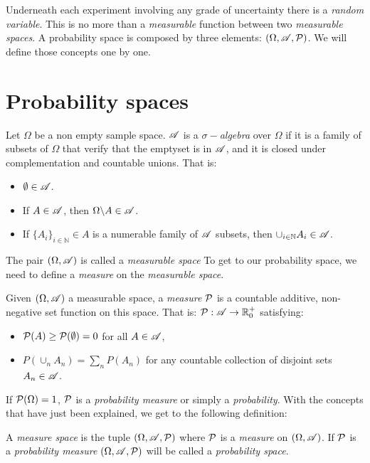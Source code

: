 

Underneath each experiment involving any grade of uncertainty there is a \emph{random variable}. This is no more than a \emph{measurable} function between two \emph{measurable spaces}.
A probability space is composed by three elements: $(\Omega, \mathscr{A}, \mathcal{P})$. We will define those concepts one by one.

\section{Probability spaces}

\begin{ndef}Let $\Omega$ be a non empty sample space. $\mathscr{A}$ is a \emph{$\sigma-$algebra} over $\Omega$ if it is a family of subsets of $\Omega$ that verify that the emptyset is in $\mathscr{A}$, and it is closed under complementation and countable unions. That is:
\begin{itemize}
  \item $\emptyset \in \mathscr{A}$.
  \item If $A \in \mathscr{A}$, then $\Omega \backslash A \in \mathscr{A}$.
  \item If $\{A_i\}_{i \in \mathbb N} \in A$ is a numerable family of $\mathscr{A}$ subsets, then $\cup_{i \in \mathbb N} A_i \in \mathscr{A}$.
\end{itemize}
\end{ndef}


The pair $(\Omega,\mathscr{A})$ is called a \emph{measurable space} To get to our probability space, we need to define a \emph{measure} on the \emph{measurable space}.

\begin{ndef}
Given $(\Omega,\mathscr{A})$ a measurable space, a \emph{measure} $\mathcal{P}$ is a countable additive, non-negative set function on this space. That is: $\mathcal{P}: \mathscr{A} \to \mathbb R_0^+$ satisfying:
\begin{itemize}
  \item $\mathcal{P}(A) \geq \mathcal{P}(\emptyset) = 0$ for all $A \in \mathscr{A}$,
  \item $P(\cup_n A_n) = \sum_n P(A_n)$ for any countable collection of disjoint sets $A_n \in \mathscr{A}$.
\end{itemize}
\end{ndef}

If $\mathcal{P}(\Omega) = 1$, $\mathcal{P}$ is a \emph{probability measure} or simply a \emph{probability}. With the concepts that have just been explained, we get to the following definition:

\begin{ndef}
A \emph{measure space} is the tuple $(\Omega, \mathscr{A},\mathcal{P})$ where $\mathcal{P}$ is a \emph{measure} on $(\Omega, \mathscr{A})$. If $\mathcal{P}$ is a \emph{probability measure} $(\Omega,\mathscr{A},\mathcal{P})$ will be called a \emph{probability space}.
\end{ndef}

